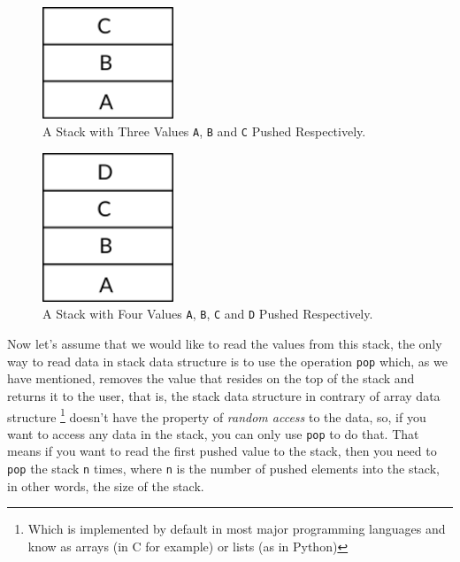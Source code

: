 \begin{figure}
\centering
\includegraphics[width=0.35000\textwidth]{Figures/x86-ch/abcd-stack-step2.png}
\caption{A Stack with Three Values \lstinline!A!, \lstinline!B! and
\lstinline!C! Pushed Respectively.}\label{fig:abcd-stack-step2}
\end{figure}

\begin{figure}
\centering
\includegraphics[width=0.35000\textwidth]{Figures/x86-ch/abcd-stack-step3.png}
\caption{A Stack with Four Values \lstinline!A!, \lstinline!B!,
\lstinline!C! and \lstinline!D! Pushed
Respectively.}\label{fig:abcd-stack-step3}
\end{figure}

Now let's assume that we would like to read the values from this stack,
the only way to read data in stack data structure is to use the
operation \lstinline!pop! which, as we have mentioned, removes the value
that resides on the top of the stack and returns it to the user, that
is, the stack data structure in contrary of array data structure
\footnote{Which is implemented by default in most major programming
  languages and know as arrays (in C for example) or lists (as in
  Python)} doesn't have the property of \emph{random access} to the
data, so, if you want to access any data in the stack, you can only use
\lstinline!pop! to do that. That means if you want to read the first
pushed value to the stack, then you need to \lstinline!pop! the stack
\lstinline!n! times, where \lstinline!n! is the number of pushed
elements into the stack, in other words, the size of the stack.

